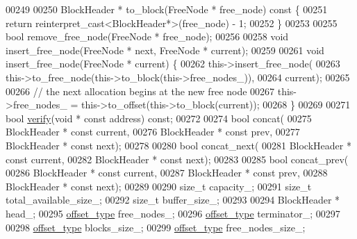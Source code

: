 \begin{DoxyCode}
00249 
00250     BlockHeader * to\_block(FreeNode * free\_node)\textcolor{keyword}{ const }\{
00251         \textcolor{keywordflow}{return} \textcolor{keyword}{reinterpret\_cast<}BlockHeader*\textcolor{keyword}{>}(free\_node) - 1;
00252     \}
00253 
00255     \textcolor{keywordtype}{bool} remove\_free\_node(FreeNode * free\_node);
00256 
00258     \textcolor{keywordtype}{void} insert\_free\_node(FreeNode * next, FreeNode * current);
00259 
00261     \textcolor{keywordtype}{void} insert\_free\_node(FreeNode * current) \{
00262         this->insert\_free\_node(
00263             this->to\_free\_node(this->to\_block(this->free\_nodes\_)),
00264             current);
00265 
00266         \textcolor{comment}{// the next allocation begins at the new free node}
00267         this->free\_nodes\_ = this->to\_offset(this->to\_block(current));
00268     \}
00269 
00271     \textcolor{keywordtype}{bool} \hyperlink{classhryky_1_1memory_1_1heap_1_1_arbitrary_a0fe78b479fc34967df52afa280c8d16d}{verify}(\textcolor{keywordtype}{void} * \textcolor{keyword}{const} address) \textcolor{keyword}{const};
00272 
00274     \textcolor{keywordtype}{bool} concat(
00275         BlockHeader * \textcolor{keyword}{const} current,
00276         BlockHeader * \textcolor{keyword}{const} prev,
00277         BlockHeader * \textcolor{keyword}{const} next);
00278 
00280     \textcolor{keywordtype}{bool} concat\_next(
00281         BlockHeader * \textcolor{keyword}{const} current,
00282         BlockHeader * \textcolor{keyword}{const} next);
00283 
00285     \textcolor{keywordtype}{bool} concat\_prev(
00286         BlockHeader * \textcolor{keyword}{const} current,
00287         BlockHeader * \textcolor{keyword}{const} prev,
00288         BlockHeader * \textcolor{keyword}{const} next);
00289 
00290     \textcolor{keywordtype}{size\_t}              capacity\_;
00291     \textcolor{keywordtype}{size\_t}              total\_available\_size\_;
00292     \textcolor{keywordtype}{size\_t}              buffer\_size\_;
00293 
00294     BlockHeader *       head\_;
00295     \hyperlink{classhryky_1_1memory_1_1heap_1_1_arbitrary_a93027662f345b66e738ce8b2c9293e94}{offset_type}         free\_nodes\_;
00296     \hyperlink{classhryky_1_1memory_1_1heap_1_1_arbitrary_a93027662f345b66e738ce8b2c9293e94}{offset_type}         terminator\_;
00297     
00298     \hyperlink{classhryky_1_1memory_1_1heap_1_1_arbitrary_a93027662f345b66e738ce8b2c9293e94}{offset_type}         blocks\_size\_;
00299     \hyperlink{classhryky_1_1memory_1_1heap_1_1_arbitrary_a93027662f345b66e738ce8b2c9293e94}{offset_type}         free\_nodes\_size\_;

\end{DoxyCode}
